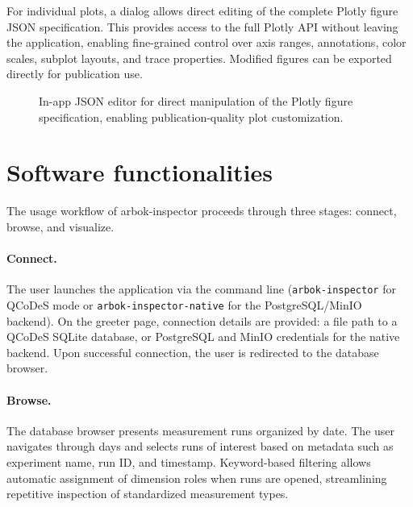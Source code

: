 For individual plots, a dialog allows direct editing of the complete Plotly figure JSON specification.
This provides access to the full Plotly API without leaving the application, enabling fine-grained control over axis ranges, annotations, color scales, subplot layouts, and trace properties.
Modified figures can be exported directly for publication use.


\begin{figure}[H]
\caption{In-app JSON editor for direct manipulation of the Plotly figure specification, enabling publication-quality plot customization.}
\label{fig:inspector_json_editor}
\end{figure}

\section{Software functionalities}

The usage workflow of arbok-inspector proceeds through three stages: connect, browse, and visualize.

\paragraph{Connect.}
The user launches the application via the command line (\texttt{arbok-inspector} for QCoDeS mode or \texttt{arbok-inspector-native} for the PostgreSQL/MinIO backend).
On the greeter page, connection details are provided: a file path to a QCoDeS SQLite database, or PostgreSQL and MinIO credentials for the native backend.
Upon successful connection, the user is redirected to the database browser.

\paragraph{Browse.}
The database browser presents measurement runs organized by date.
The user navigates through days and selects runs of interest based on metadata such as experiment name, run ID, and timestamp.
Keyword-based filtering allows automatic assignment of dimension roles when runs are opened, streamlining repetitive inspection of standardized measurement types.

